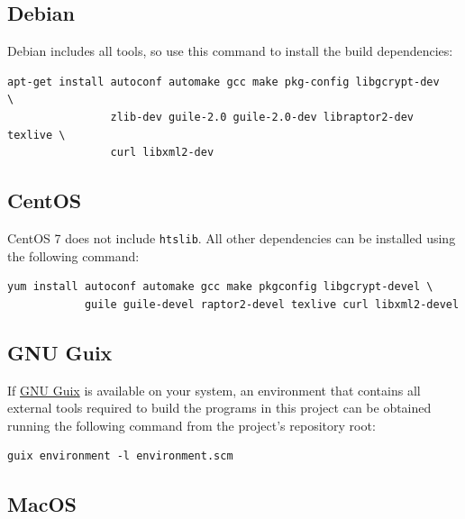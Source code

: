 \subsection{Debian}

  Debian includes all tools, so use this command to install the
  build dependencies:

\begin{siderules}
\begin{verbatim}
apt-get install autoconf automake gcc make pkg-config libgcrypt-dev     \
                zlib-dev guile-2.0 guile-2.0-dev libraptor2-dev texlive \
                curl libxml2-dev
\end{verbatim}
\end{siderules}

\subsection{CentOS}

  CentOS 7 does not include \texttt{htslib}.  All other dependencies can
  be installed using the following command:

\begin{siderules}
\begin{verbatim}
yum install autoconf automake gcc make pkgconfig libgcrypt-devel \
            guile guile-devel raptor2-devel texlive curl libxml2-devel
\end{verbatim}
\end{siderules}

\subsection{GNU Guix}

  If \href{https://www.gnu.org/software/guix}{GNU Guix} is available on your
  system, an environment that contains all external tools required to build
  the programs in this project can be obtained running the following command
  from the project's repository root:

\begin{siderules}
\begin{verbatim}
guix environment -l environment.scm
\end{verbatim}
\end{siderules}

\subsection{MacOS}

